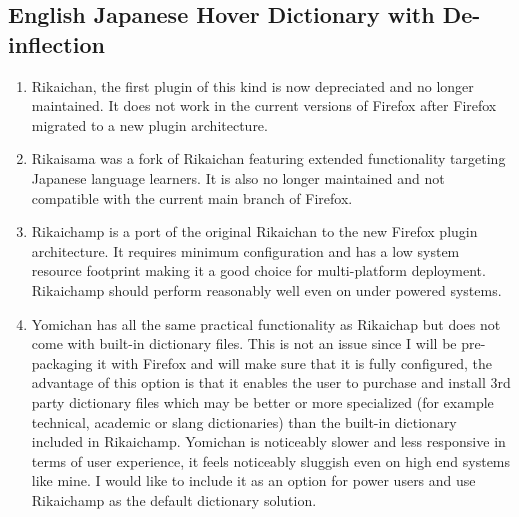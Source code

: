 \documentclass{article}
\begin{document}
\subsection{English Japanese Hover Dictionary with De-inflection}
\begin{enumerate}
    \item Rikaichan, the first plugin of this kind is now depreciated and no longer maintained. It does not work in the current versions of Firefox after Firefox migrated to a new plugin architecture.
    \item Rikaisama was a fork of Rikaichan featuring extended functionality targeting Japanese language learners. It is also no longer maintained and not compatible with the current main branch of Firefox.
    \item Rikaichamp is a port of the original Rikaichan to the new Firefox plugin architecture. It requires minimum configuration and has a low system resource footprint making it a good choice for multi-platform deployment. Rikaichamp should perform reasonably well even on under powered systems.
    \item Yomichan has all the same practical functionality as Rikaichap but does not come with built-in dictionary files. This is not an issue since I will be pre-packaging it with Firefox and will make sure that it is fully configured, the advantage of this option is that it enables the user to purchase and install 3rd party dictionary files which may be better or more specialized (for example technical, academic or slang dictionaries) than the built-in dictionary included in Rikaichamp. Yomichan is noticeably slower and less responsive in terms of user experience, it feels noticeably sluggish even on high end systems like mine. I would like to include it as an option for power users and use Rikaichamp as the default dictionary solution.
\end{enumerate}
\end{document}
